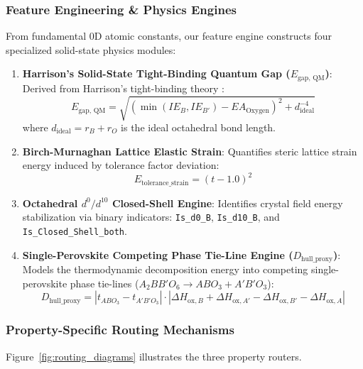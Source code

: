 \documentclass[12pt,onecolumn]{elsarticle}
\begin{document}
\subsubsection{Feature Engineering \& Physics Engines}
From fundamental 0D atomic constants, our feature engine constructs four specialized solid-state physics modules:
\begin{enumerate}
\item \textbf{Harrison's Solid-State Tight-Binding Quantum Gap ($E_{\text{gap, QM}}$)}: Derived from Harrison's tight-binding theory \cite{harrison1999elementary}:
   \begin{equation}
   E_{\text{gap, QM}} = \sqrt{\left(\min(IE_B, IE_{B'}) - EA_{\text{Oxygen}}\right)^2 + d_{\text{ideal}}^{-4}}
   \end{equation}
   where $d_{\text{ideal}} = r_B + r_O$ is the ideal octahedral bond length.

\item \textbf{Birch-Murnaghan Lattice Elastic Strain}: Quantifies steric lattice strain energy induced by tolerance factor deviation:
   \begin{equation}
   E_{\text{tolerance\_strain}} = (t - 1.0)^2
   \end{equation}

\item \textbf{Octahedral $d^0/d^{10}$ Closed-Shell Engine}: Identifies crystal field energy stabilization via binary indicators: \texttt{Is\_d0\_B}, \texttt{Is\_d10\_B}, and \texttt{Is\_Closed\_Shell\_both}.

\item \textbf{Single-Perovskite Competing Phase Tie-Line Engine ($D_{\text{hull\_proxy}}$)}: Models the thermodynamic decomposition energy into competing single-perovskite phase tie-lines ($A_2BB'O_6 \rightarrow ABO_3 + A'B'O_3$):
   \begin{equation}
   D_{\text{hull\_proxy}} = |t_{ABO_3} - t_{A'B'O_3}| \cdot \left|\Delta H_{\text{ox}, B} + \Delta H_{\text{ox}, A'} - \Delta H_{\text{ox}, B'} - \Delta H_{\text{ox}, A}\right|
   \end{equation}
\end{enumerate}

\subsubsection{Property-Specific Routing Mechanisms}

Figure~\ref{fig:routing_diagrams} illustrates the three property routers.
\end{document}
